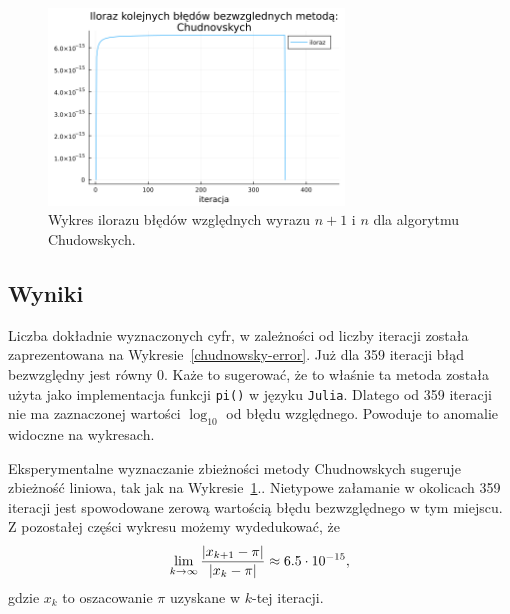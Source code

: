 \begin{figure}[!h]
    \centering
    \renewcommand{\figurename}{Wykres}
    \includegraphics[width=0.7\textwidth]{../prog/chudnowsky_error_ratio.png}
    \caption{Wykres ilorazu błędów względnych wyrazu $n+1$ i $n$ dla algorytmu Chudowskych.}
    \label{chudnowsky-convergence}
\end{figure}

\subsection{Wyniki}

Liczba dokładnie wyznaczonych cyfr, w zależności od liczby iteracji została zaprezentowana na Wykresie~\ref{chudnowsky-error}. Już dla 359 iteracji błąd bezwzględny jest równy 0. Każe to sugerować, że to właśnie ta metoda została użyta jako implementacja funkcji \verb+pi()+ w języku \verb+Julia+. Dlatego od 359 iteracji nie ma zaznaczonej wartości $\log_{10}$ od błędu względnego. Powoduje to anomalie widoczne na wykresach.

Eksperymentalne wyznaczanie zbieżności metody Chudnowskych sugeruje zbieżność liniowa, tak jak na Wykresie~\ref{chudnowsky-convergence}.. Nietypowe załamanie w okolicach 359 iteracji jest spowodowane zerową wartością błędu bezwzględnego w tym miejscu. Z pozostałej części wykresu możemy wydedukować, że
$$\lim_{k\to\infty}{{|x_{k+1}-\pi|\over |x_k-\pi|}}\approx 6.5\cdot 10^{-15},$$
gdzie $x_k$ to oszacowanie $\pi$ uzyskane w $k$-tej iteracji.